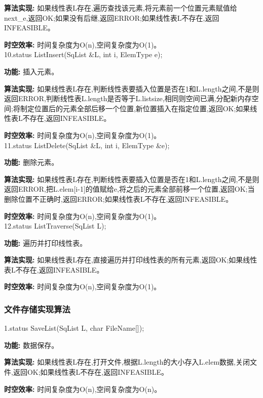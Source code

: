 \documentclass[supercite]{Experimental_Report}
\theoremstyle{definition}
\begin{document}
\textbf{算法实现: }如果线性表L存在,遍历查找该元素,将元素前一个位置元素赋值给next\_e,返回OK;如果没有后继,返回ERROR;如果线性表L不存在,返回INFEASIBLE。

\textbf{时空效率: }时间复杂度为O(n),空间复杂度为O(1)。\\

10.status ListInsert(SqList \&L, int i, ElemType e);

\textbf{功能: }插入元素。

\textbf{算法实现: }如果线性表L存在,判断线性表要插入位置是否在1和L.length之间,不是则返回ERROR,判断线性表L.length是否等于L.listsize,相同则空间已满,分配新内存空间;将制定位置后的元素全部后移一个位置,新位置插入在指定位置,返回OK;如果线性表L不存在,返回INFEASIBLE。

\textbf{时空效率: }时间复杂度为O(n),空间复杂度为O(1)。\\

11.status ListDelete(SqList \&L, int i, ElemType \&e);

\textbf{功能: }删除元素。

\textbf{算法实现: }如果线性表L存在,判断线性表要插入位置是否在1和L.length之间,不是则返回ERROR,把L.elem[i-1]的值赋给e,将之后的元素全部前移一个位置,返回OK;当删除位置不正确时,返回ERROR;如果线性表L不存在,返回INFEASIBLE。

\textbf{时空效率: }时间复杂度为O(n),空间复杂度为O(1)。\\

12.status ListTraverse(SqList L);

\textbf{功能: }遍历并打印线性表。

\textbf{算法实现: }如果线性表L存在,直接遍历并打印线性表的所有元素,返回OK;如果线性表L不存在,返回INFEASIBLE。

\textbf{时空效率: }时间复杂度为O(n),空间复杂度为O(1)。\\

\subsubsection{文件存储实现算法}

1.status SaveList(SqList L, char FileName[]);

\textbf{功能: }数据保存。

\textbf{算法实现: }如果线性表L存在,打开文件,根据L.length的大小存入L.elem数据,关闭文件,返回OK;如果线性表L不存在,返回INFEASIBLE。

\textbf{时空效率: }时间复杂度为O(n),空间复杂度为O(n)。\\
\end{document}
